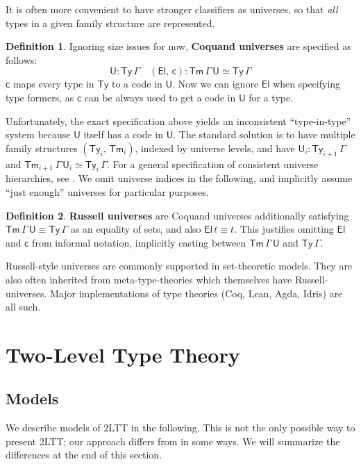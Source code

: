 \documentclass[12pt,a4paper,twoside,openany]{book}
\theoremstyle{remark}
\theoremstyle{definition}
\newtheorem{mydefinition}{Definition}
\theoremstyle{theorem}
\newcommand{\ms}[1]{\mathsf{#1}}
\newcommand{\Tm}{\mathsf{Tm}}
\newcommand{\Ty}{\mathsf{Ty}}
\newcommand{\U}{\mathsf{U}}
\newcommand{\El}{\mathsf{El}}
\begin{document}
It is often more convenient to have stronger classifiers as universes, so that
\emph{all} types in a given family structure are represented.

\begin{mydefinition}
Ignoring size issues for now, \textbf{Coquand universes}
\cite{coquand2018canonicity} are specified as follows:
\[
  \U : \Ty\,\Gamma\hspace{1em} (\El,\,\ms{c}) : \Tm\,\Gamma\,\U \simeq \Ty\,\Gamma
\]
$\ms{c}$ maps every type in $\Ty$ to a code in $\U$. Now we can ignore $\El$
when specifying type formers, as $\ms{c}$ can be always used to get a code in
$\U$ for a type.
\end{mydefinition}

Unfortunately, the exact specification above yields an inconsistent
``type-in-type'' system because $\U$ itself has a code in $\U$. The standard
solution is to have multiple family structures $(\Ty_i,\,\Tm_i)$, indexed by
universe levels, and have $\U_i : \Ty_{i + 1}\,\Gamma$ and
$\Tm_{i+1}\,\Gamma\,\U_i \simeq \Ty_i\,\Gamma$. For a general specification of
consistent universe hierarchies, see \cite{kovacs2021generalized}. We omit
universe indices in the following, and implicitly assume ``just enough''
universes for particular purposes.

\begin{mydefinition}
\textbf{Russell universes} are Coquand universes additionally satisfying
$\Tm\,\Gamma\,\U \equiv \Ty\,\Gamma$ as an equality of sets, and also $\ms{El}\,t \equiv
t$. This justifies omitting $\El$ and $\ms{c}$ from informal notation,
implicitly casting between $\Tm\,\Gamma\,\U$ and $\Ty\,\Gamma$.
\end{mydefinition}
Russell-style universes are commonly supported in set-theoretic models. They are
also often inherited from meta-type-theories which themselves have
Russell-universes. Major implementations of type theories (Coq, Lean, Agda,
Idris) are all such.


\section{Two-Level Type Theory}

\subsection{Models}

We describe models of 2LTT in the following. This is not the only possible way
to present 2LTT; our approach differs from \cite{twolevel} in some ways. We will summarize
the differences at the end of this section.
\end{document}

